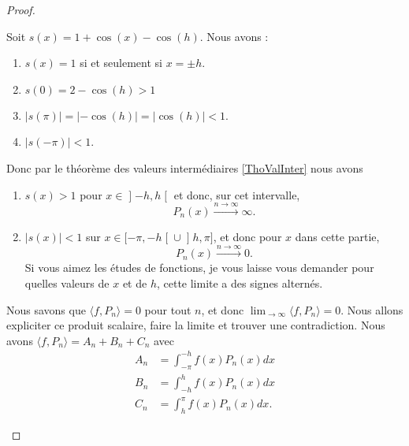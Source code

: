 \begin{proof}
\begin{subproof}
		Soit \( s(x)=1+\cos(x)-\cos(h)\). Nous avons :
		\begin{enumerate}
			\item
			      \( s(x)=1\) si et seulement si \( x=\pm h\).
			\item
			      \( s(0)=2-\cos(h)>1\)
			\item
			      \( | s(\pi) |=| -\cos(h) |=| \cos(h) |<1\).
			\item
			      \( | s(-\pi) |<1\).
		\end{enumerate}
		Donc par le théorème des valeurs intermédiaires \ref{ThoValInter} nous avons
		\begin{enumerate}
			\item
			      \( s(x)>1\) pour \( x\in\mathopen] -h,h\mathclose[\) et donc, sur cet intervalle,
			      \begin{equation}
				      P_n(x)\stackrel{ n\to\infty}{\longrightarrow} \infty.
			      \end{equation}
			\item
			      \( | s(x) |<1\) sur \( x\in\mathopen[ -\pi,-h\mathclose[\cup \mathopen] h,\pi\mathclose]\), et donc pour \( x\) dans cette partie,
			      \begin{equation}
				      P_n(x)\stackrel{ n\to \infty}{\longrightarrow} 0.
			      \end{equation}
			      Si vous aimez les études de fonctions, je vous laisse vous demander pour quelles valeurs de \( x\) et de \( h\), cette limite a des signes alternés.
		\end{enumerate}

		Nous savons que \( \langle f, P_n \rangle=0\) pour tout \( n\), et donc \( \lim_{\to \infty}\langle f, P_n \rangle=0\). Nous allons expliciter ce produit scalaire, faire la limite et trouver une contradiction. Nous avons \( \langle f, P_n \rangle=A_n+B_n+C_n\) avec
		\begin{subequations}
			\begin{align}
				A_n & = \int_{-\pi}^{-h}f(x)P_n(x)dx \\
				B_n & = \int_{-h}^hf(x)P_n(x)dx      \\
				C_n & = \int_h^{\pi}f(x)P_n(x)dx.
			\end{align}
		\end{subequations}


\end{subproof}
\end{proof}
